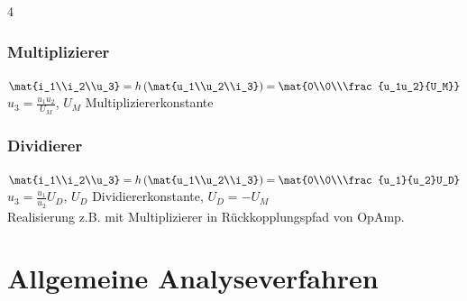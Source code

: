 \documentclass[fs, footer]{latex4ei}
\begin{document}
\begin{multicols*}{4}
    \subsubsection{Multiplizierer}
    $\mat{i_1\\i_2\\u_3} = h\left(\mat{u_1\\u_2\\i_3}\right) = \mat{0\\0\\\frac{u_1u_2}{U_M}}$\quad$u_3=\frac{u_1u_2}{U_M}$, $U_M$ Multipliziererkonstante

    \subsubsection{Dividierer}
    $\mat{i_1\\i_2\\u_3} = h\left(\mat{u_1\\u_2\\i_3}\right) = \mat{0\\0\\\frac{u_1}{u_2}U_D}$\quad$u_3=\frac{u_1}{u_2}U_D$, $U_D$ Dividiererkonstante, $U_D = -U_M$\\
    Realisierung z.B. mit Multiplizierer in Rückkopplungspfad von OpAmp.

    \section{Allgemeine Analyseverfahren}

\end{multicols*}
\end{document}
